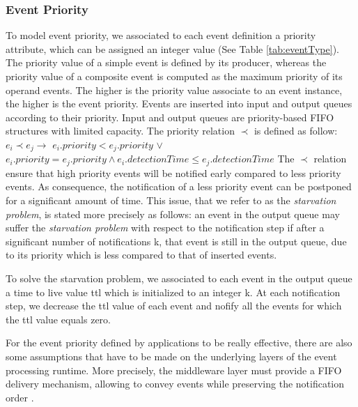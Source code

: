 \documentclass[a4paper,twoside]{article}
\begin{document}
\subsubsection{Event Priority}
To model event priority, we associated to each event definition a priority attribute, which can be assigned an integer value (See Table \ref{tab:eventType}). The priority value of a simple event is defined by its producer, whereas the priority value of a composite event is computed as the maximum priority of its operand events. The higher is the priority value associate to an event instance, the higher is the event priority. Events are inserted into input and output queues according to their priority. Input and output queues are priority-based FIFO structures with limited capacity. The priority relation $\prec$ is defined as follow: \newline
$e_i \prec e_j \rightarrow$ \newline
$e_i .priority < e_{j}.priority$  $\vee$    \newline
$e_i .priority = e_{j}.priority \wedge e_i.detectionTime \leq e_j.detectionTime$ \newline
The $\prec$ relation ensure that high priority events will be notified early compared to less priority events. As consequence, the notification of a less priority event can be postponed for a significant amount of time. This issue, that we refer to as the \textit{starvation problem}, is stated more precisely as follows:
an event in the output queue may suffer the \textit{starvation problem} with respect to the notification step if after a significant number of notifications k, that event is still in the output queue, due to its priority which is less compared to that of inserted events. 

To solve the starvation problem, we associated to each event in the output queue a time to live value ttl which is initialized to an integer k. At each notification step, we decrease the ttl value of each event and nofify all the events for which the ttl value equals zero. 

For the event priority defined by applications to be really effective, there are also some assumptions that have to be made on the underlying layers of the event processing runtime. More precisely, the middleware layer must provide a FIFO delivery mechanism, allowing to convey events while preserving the notification order \cite{Chockler2001,Malekpour2011}.
\end{document}

